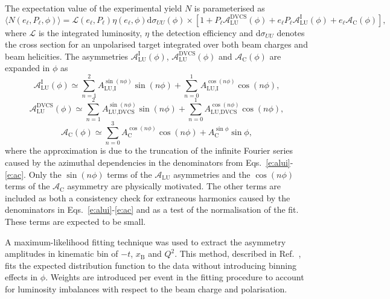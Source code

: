 The expectation value of the experimental yield $N$ is parameterised as
\begin{equation}
 \langle N(e_{\ell},P_{\ell},\phi)\rangle =
\mathcal{L}(e_{\ell},P_{\ell})\eta(e_{\ell},\phi)\textrm{d}\sigma_{UU}
(\phi)\times
[1+P_{\ell}\mathcal{A}_{\textrm{LU}}^{\textrm{DVCS}}(\phi)+e_{\ell}P_{\ell}
\mathcal{A}_{\textrm{LU}}^{\textrm{I}}(\phi)+e_{\ell}\mathcal{A}_{\textrm{C}}
(\phi)],
\end{equation}
where $\mathcal{L}$ is the integrated luminosity, $\eta$ the detection
efficiency and d$\sigma_{UU}$ denotes the
cross section for an unpolarised target integrated over both beam charges and
beam helicities. The asymmetries $\mathcal{A}_{\textrm{LU}}^{\textrm{I}}(\phi)$,
$\mathcal{A}_{\textrm{LU}}^{\textrm{DVCS}}(\phi)$ and
$\mathcal{A}_{\textrm{C}}(\phi)$ are expanded in
$\phi$ as
\begin{equation}
\mathcal{A}_{\textrm{LU}}^{\textrm{I}}(\phi) \simeq \sum^{2}_{n=1}
A_{\textrm{LU,I}}^{\sin(n\phi)}\sin(n\phi) 
+ \sum^{1}_{n=0} A_{\textrm{LU,I}}^{\cos(n\phi)}\cos(n\phi),
\label{alui_asym}
\end{equation}
\begin{equation}
 \mathcal{A}_{\textrm{LU}}^{\textrm{DVCS}}(\phi) \simeq \sum^{2}_{n=1}
A_{\textrm{LU,DVCS}}^{\sin(n\phi)}\sin(n\phi) 
+ \sum^{1}_{n=0} A_{\textrm{LU,DVCS}}^{\cos(n\phi)}\cos(n\phi),
\label{aludvcs_asym}
\end{equation}
\begin{equation}
\mathcal{A}_{\textrm{C}}(\phi) \simeq \sum^{3}_{n=0}
A_{\textrm{C}}^{\cos(n\phi)}\cos(n\phi) 
+ A_{\textrm{C}}^{\sin\phi}\sin\phi,
\label{ac_asym}
\end{equation}
where the approximation is due to the truncation of the infinite Fourier series
caused by the azimuthal dependencies in the denominators from
Eqs.~\ref{e:alui}-\ref{e:ac}. Only the $\sin(n\phi)$ terms of the
$\mathcal{A}_{\textrm{LU}}$ asymmetries and the $\cos(n\phi)$ terms of the
$\mathcal{A}_{\textrm{C}}$ asymmetry are physically motivated. The other terms
are included as both a consistency check for extraneous harmonics caused
by the denominators in Eqs.~\ref{e:alui}-\ref{e:ac} and as a test of the
normalisation of the fit. These terms are expected to be small.

A maximum-likelihood fitting technique \cite{Barlow1990} was used to
extract the asymmetry amplitudes in  kinematic bin of $-t$, $x_{\textrm{B}}$ and $Q^{2}$.
This method, described in Ref.~\cite{HERMESCollaboration2008}, fits the expected
 distribution function to the data without introducing binning effects in $\phi$.
Weights are introduced per event in the fitting procedure to account for
luminosity imbalances with respect to the beam charge and polarisation.

